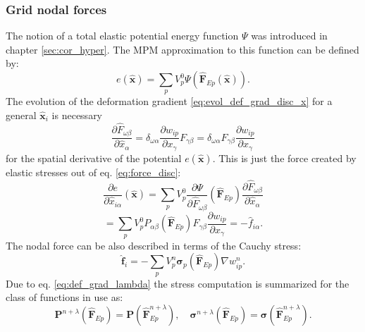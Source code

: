 \documentclass[m,times]{cgMA}
\begin{document}
\subsubsection{Grid nodal forces}
The notion of a total elastic potential energy function $\Psi$ was introduced in chapter \ref{sec:cor_hyper}. The MPM approximation to this function can be defined by:
\begin{equation}\label{eq:energy_discr}
  e(\hat{\boldsymbol{x}}) = \sum_pV^0_p \Psi(\hat{\boldsymbol{F}}_{Ep}(\hat{\boldsymbol{x}})).
\end{equation}
The evolution of the deformation gradient \ref{eq:evol_def_grad_disc_x} for a general $\boldsymbol{\hat{x}}_i$ is necessary
\begin{equation}\label{eq:partial_def_grad}
\frac{\partial \hat{F}_{\omega\beta}}{\partial \hat{x}_\alpha}
= \delta_{\omega \alpha}
\frac{\partial w_{ip}}{\partial x_\gamma}F_{\gamma\beta} = \delta_{\omega \alpha}F_{\gamma\beta} \frac{\partial{w_{ip}}}{\partial x_\gamma}
\end{equation}
for the spatial derivative of the potential $e(\boldsymbol{\hat{x}})$. This is just the force created by elastic stresses out of eq. \ref{eq:force_disc}:
$$
  \frac{\partial e}{\partial \hat{x}_{i\alpha}}(\hat{\boldsymbol{x}})
  = \sum_p V^0_p \frac{\partial \Psi}{\partial \hat{F}_{\omega\beta}}(\hat{\boldsymbol{F}}_{Ep})\frac{\partial \hat{F}_{\omega\beta}}{\partial \hat{x}_\alpha}
  $$
  \begin{equation}\label{eq:nodal_force}
  = \sum_p V^0_p P_{\alpha\beta}(\hat{\boldsymbol{F}}_{Ep})F_{\gamma\beta}\frac{\partial w_{ip}}{\partial x_\gamma} = -\hat{f}_{i\alpha}.
\end{equation}
The nodal force can be also described in terms of the Cauchy stress:
\begin{equation}
  \boldsymbol{\hat{f}}_i = - \sum_p V^n_p \boldsymbol{\sigma}_p(\boldsymbol{\hat{F}}_{Ep})\nabla{w^n_{ip}}.
 \end{equation}
Due to eq. \ref{eq:def_grad_lambda} the stress computation is summarized for the class of functions in use as:
\begin{equation}
  \boldsymbol{P}^{n+\lambda}(\hat{\boldsymbol{F}}_{Ep}) = \boldsymbol{P}(\hat{\boldsymbol{F}}^{n+\lambda}_{Ep}),
  \quad
  \boldsymbol{\sigma}^{n+\lambda}(\hat{\boldsymbol{F}}_{Ep}) = \boldsymbol{\sigma}(\hat{\boldsymbol{F}}^{n+\lambda}_{Ep}).
\end{equation}
\begin{flushright}\cite{MPM:COURSE}\cite{MPM:APIC}\end{flushright}
\end{document}
